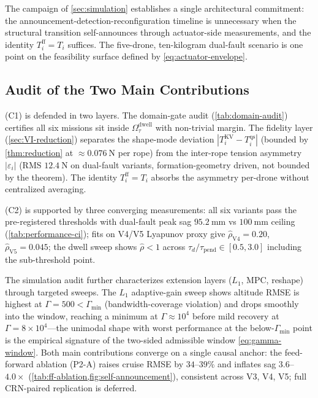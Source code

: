 The campaign of \cref{sec:simulation} establishes a single architectural commitment: the announcement-detection-reconfiguration timeline is unnecessary when the structural transition self-announces through actuator-side measurements, and the identity $T_i^{\mathrm{ff}}=T_i$ suffices. The five-drone, ten-kilogram dual-fault scenario is one point on the feasibility surface defined by \eqref{eq:actuator-envelope}.

\subsection{Audit of the Two Main Contributions}
\label{sec:discussion-audit}

 (C1) is defended in two layers. The domain-gate audit (\cref{tab:domain-audit}) certifies all six missions sit inside $\Omega^{\mathrm{dwell}}_{\tau}$ with non-trivial margin. The fidelity layer (\cref{sec:VI-reduction}) separates the shape-mode deviation $|T_i^{\mathrm{KV}} - T_i^{\mathrm{qs}}|$ (bounded by \cref{thm:reduction} at $\approx\SI{0.076}{\newton}$ per rope) from the inter-rope tension asymmetry $|\varepsilon_i|$ (RMS $\SI{12.4}{\newton}$ on dual-fault variants, formation-geometry driven, not bounded by the theorem). The identity $T_i^{\mathrm{ff}} = T_i$ absorbs the asymmetry per-drone without centralized averaging.

 (C2) is supported by three converging measurements: all six variants pass the pre-registered thresholds with dual-fault peak sag $\SI{95.2}{\milli\metre}$ vs $\SI{100}{\milli\metre}$ ceiling (\cref{tab:performance-ci}); fits on V4/V5 Lyapunov proxy give $\hat\rho_{\mathrm{V4}}=0.20$, $\hat\rho_{\mathrm{V5}}=0.045$; the dwell sweep shows $\hat\rho < 1$ across $\tau_d/\tau_{\mathrm{pend}}\in[0.5,3.0]$ including the sub-threshold point. 

The simulation audit further characterizes extension layers ($L_1$, MPC, reshape) through targeted sweeps. The $L_1$ adaptive-gain sweep shows altitude RMSE is highest at $\Gamma=500 < \Gamma_{\min}$ (bandwidth-coverage violation) and drops smoothly into the window, reaching a minimum at $\Gamma \approx 10^4$ before mild recovery at $\Gamma=8\times10^4$---the unimodal shape with worst performance at the below-$\Gamma_{\min}$ point is the empirical signature of the two-sided admissible window \eqref{eq:gamma-window}. Both main contributions converge on a single causal anchor: the feed-forward ablation (P2-A) raises cruise RMSE by $34$--$39\%$ and inflates sag $3.6$--$4.0\times$ (\cref{tab:ff-ablation,fig:self-announcement}), consistent across V3, V4, V5; full CRN-paired replication is deferred.

